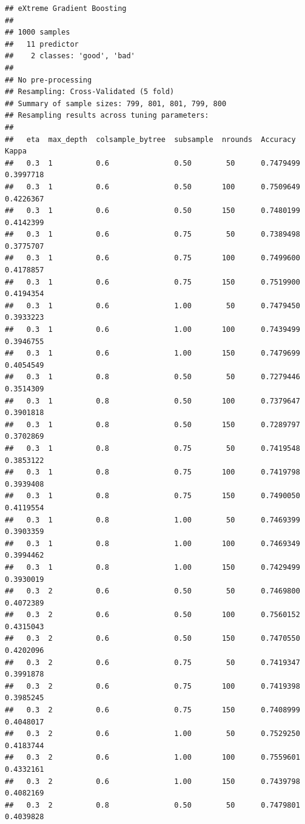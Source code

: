 \documentclass[
  spanish,
]{book}
\theoremstyle{break}
\theoremstyle{definition}
\theoremstyle{definition}
\theoremstyle{definition}
\theoremstyle{definition}
\theoremstyle{remark}
\begin{document}
\begin{verbatim}
## eXtreme Gradient Boosting 
## 
## 1000 samples
##   11 predictor
##    2 classes: 'good', 'bad' 
## 
## No pre-processing
## Resampling: Cross-Validated (5 fold) 
## Summary of sample sizes: 799, 801, 801, 799, 800 
## Resampling results across tuning parameters:
## 
##   eta  max_depth  colsample_bytree  subsample  nrounds  Accuracy   Kappa    
##   0.3  1          0.6               0.50        50      0.7479499  0.3997718
##   0.3  1          0.6               0.50       100      0.7509649  0.4226367
##   0.3  1          0.6               0.50       150      0.7480199  0.4142399
##   0.3  1          0.6               0.75        50      0.7389498  0.3775707
##   0.3  1          0.6               0.75       100      0.7499600  0.4178857
##   0.3  1          0.6               0.75       150      0.7519900  0.4194354
##   0.3  1          0.6               1.00        50      0.7479450  0.3933223
##   0.3  1          0.6               1.00       100      0.7439499  0.3946755
##   0.3  1          0.6               1.00       150      0.7479699  0.4054549
##   0.3  1          0.8               0.50        50      0.7279446  0.3514309
##   0.3  1          0.8               0.50       100      0.7379647  0.3901818
##   0.3  1          0.8               0.50       150      0.7289797  0.3702869
##   0.3  1          0.8               0.75        50      0.7419548  0.3853122
##   0.3  1          0.8               0.75       100      0.7419798  0.3939408
##   0.3  1          0.8               0.75       150      0.7490050  0.4119554
##   0.3  1          0.8               1.00        50      0.7469399  0.3903359
##   0.3  1          0.8               1.00       100      0.7469349  0.3994462
##   0.3  1          0.8               1.00       150      0.7429499  0.3930019
##   0.3  2          0.6               0.50        50      0.7469800  0.4072389
##   0.3  2          0.6               0.50       100      0.7560152  0.4315043
##   0.3  2          0.6               0.50       150      0.7470550  0.4202096
##   0.3  2          0.6               0.75        50      0.7419347  0.3991878
##   0.3  2          0.6               0.75       100      0.7419398  0.3985245
##   0.3  2          0.6               0.75       150      0.7408999  0.4048017
##   0.3  2          0.6               1.00        50      0.7529250  0.4183744
##   0.3  2          0.6               1.00       100      0.7559601  0.4332161
##   0.3  2          0.6               1.00       150      0.7439798  0.4082169
##   0.3  2          0.8               0.50        50      0.7479801  0.4039828

\end{verbatim}
\end{document}
